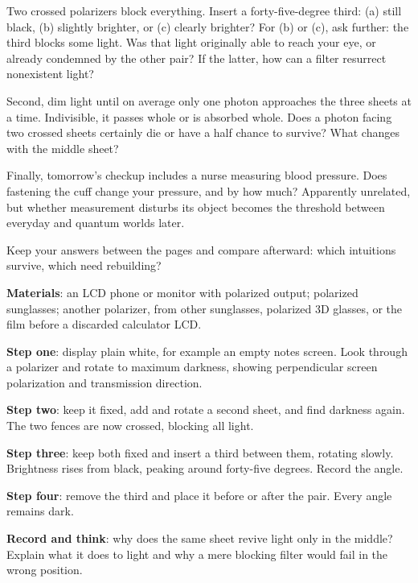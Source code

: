 Two crossed polarizers block everything. Insert a forty-five-degree third: (a) still black, (b) slightly brighter, or (c) clearly brighter? For (b) or (c), ask further: the third blocks some light. Was that light originally able to reach your eye, or already condemned by the other pair? If the latter, how can a filter resurrect nonexistent light?

Second, dim light until on average only one photon approaches the three sheets at a time. Indivisible, it passes whole or is absorbed whole. Does a photon facing two crossed sheets certainly die or have a half chance to survive? What changes with the middle sheet?

Finally, tomorrow's checkup includes a nurse measuring blood pressure. Does fastening the cuff change your pressure, and by how much? Apparently unrelated, but whether measurement disturbs its object becomes the threshold between everyday and quantum worlds later.

Keep your answers between the pages and compare afterward: which intuitions survive, which need rebuilding?


\begin{experiment}
\textbf{Materials}: an LCD phone or monitor with polarized output; polarized sunglasses; another polarizer, from other sunglasses, polarized 3D glasses, or the film before a discarded calculator LCD.

\textbf{Step one}: display plain white, for example an empty notes screen. Look through a polarizer and rotate to maximum darkness, showing perpendicular screen polarization and transmission direction.

\textbf{Step two}: keep it fixed, add and rotate a second sheet, and find darkness again. The two fences are now crossed, blocking all light.

\textbf{Step three}: keep both fixed and insert a third between them, rotating slowly. Brightness rises from black, peaking around forty-five degrees. Record the angle.

\textbf{Step four}: remove the third and place it before or after the pair. Every angle remains dark.

\textbf{Record and think}: why does the same sheet revive light only in the middle? Explain what it does to light and why a mere blocking filter would fail in the wrong position.
\end{experiment}

